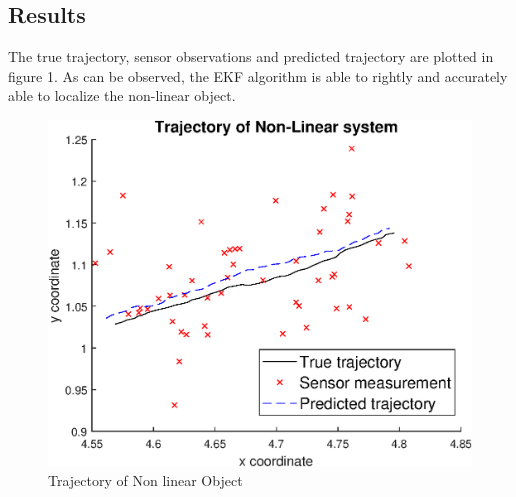 \documentclass[a4paper,11pt]{article}
\theoremstyle{mytheor}
\begin{document}
\subsection{Results}
The true trajectory, sensor observations and predicted trajectory are plotted in figure 1. As can be observed, the EKF algorithm is able to rightly and accurately able to localize the non-linear object. 
\begin{figure}[h]
    \centering
    \includegraphics[scale = 1.0]{results.eps}
    \caption{Trajectory of Non linear Object}
    \label{fig:my_label}
\end{figure}
\end{document}
